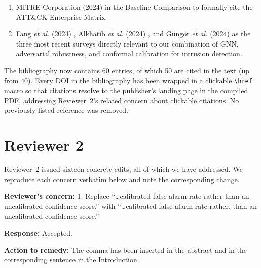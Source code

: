 \documentclass[11pt,a4paper]{article}
\newcommand{\Concern}[1]{\smallskip\noindent\textbf{\textcolor{concern}{Reviewer's concern:}} #1\par}
\newcommand{\Response}[1]{\noindent\textbf{\textcolor{response}{Response:}} #1\par}
\newcommand{\Action}[1]{\noindent\textbf{\textcolor{action}{Action to remedy:}} #1\par}
\begin{document}
{\begin{enumerate}[label=(\alph*),leftmargin=1.5em,itemsep=1pt,topsep=1pt]
  \item MITRE Corporation (2024) \cite{mitreattck2024} in the Baseline Comparison to formally cite the ATT\&CK Enterprise Matrix.
  \item Fang \emph{et al.} (2024) \cite{fang2024mlsec}, Alkhatib \emph{et al.} (2024) \cite{alkhatib2024conformal}, and G\"{u}ng\"{o}r \emph{et al.} (2024) \cite{gungor2024gnnsurvey} as the three most recent surveys directly relevant to our combination of GNN, adversarial robustness, and conformal calibration for intrusion detection.
\end{enumerate}
The bibliography now contains 60 entries, of which 50 are cited in the text (up from 40). Every DOI in the bibliography has been wrapped in a clickable \texttt{\textbackslash href} macro so that citations resolve to the publisher's landing page in the compiled PDF, addressing Reviewer~2's related concern about clickable citations. No previously listed reference was removed.}

\section*{Reviewer 2}

Reviewer~2 issued sixteen concrete edits, all of which we have addressed.
We reproduce each concern verbatim below and note the corresponding
change.

\Concern{1. Replace ``\ldots calibrated false-alarm rate rather than an uncalibrated confidence score.'' with ``\ldots calibrated false-alarm rate rather, than an uncalibrated confidence score.''}
\Response{Accepted.}
\Action{The comma has been inserted in the abstract and in the corresponding sentence in the Introduction.}
\end{document}
